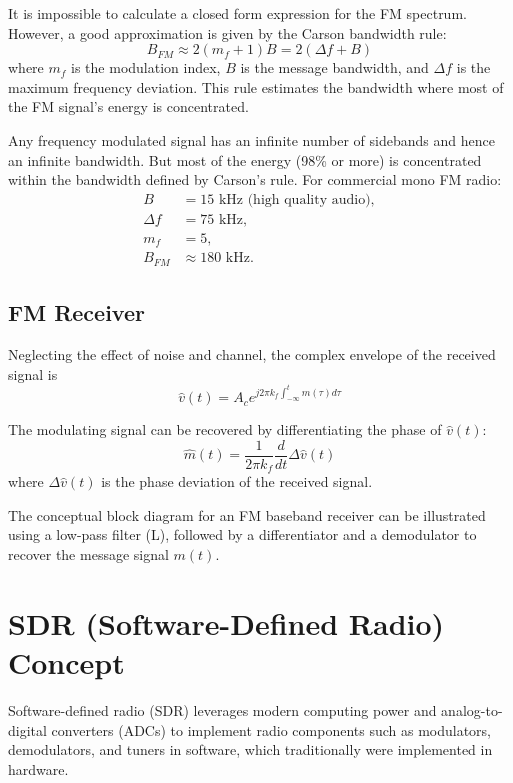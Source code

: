 It is impossible to calculate a closed form expression for the FM spectrum. However, a good approximation is given by the Carson bandwidth rule:
\[ B_{FM} \approx 2(m_f + 1)B = 2(\Delta f + B) \]
where \( m_f \) is the modulation index, \( B \) is the message bandwidth, and \( \Delta f \) is the maximum frequency deviation. This rule estimates the bandwidth where most of the FM signal's energy is concentrated.

Any frequency modulated signal has an infinite number of sidebands and hence an infinite bandwidth. But most of the energy (98\% or more) is concentrated within the bandwidth defined by Carson's rule. For commercial mono FM radio:
\begin{align*}
B &= 15 \text{ kHz (high quality audio)}, \\
\Delta f &= 75 \text{ kHz}, \\
m_f &= 5, \\
B_{FM} &\approx 180 \text{ kHz}.
\end{align*}

\subsection*{FM Receiver}

Neglecting the effect of noise and channel, the complex envelope of the received signal is
\[ \hat{v}(t) = A_c e^{j2\pi k_f \int_{-\infty}^{t} m(\tau) d\tau} \]

The modulating signal can be recovered by differentiating the phase of \( \hat{v}(t) \):
\[ \hat{m}(t) = \frac{1}{2\pi k_f} \frac{d}{dt} \Delta \hat{v}(t) \]
where \( \Delta \hat{v}(t) \) is the phase deviation of the received signal.

The conceptual block diagram for an FM baseband receiver can be illustrated using a low-pass filter (L), followed by a differentiator and a demodulator to recover the message signal \( m(t) \).

\section*{SDR (Software-Defined Radio) Concept}

Software-defined radio (SDR) leverages modern computing power and analog-to-digital converters (ADCs) to implement radio components such as modulators, demodulators, and tuners in software, which traditionally were implemented in hardware.

